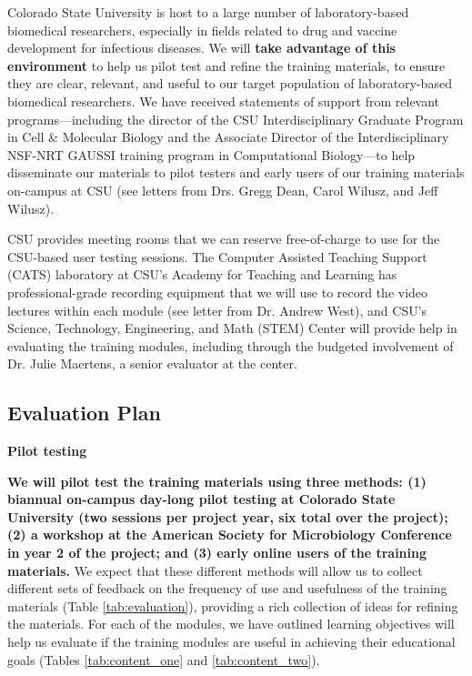 \documentclass[pdftex,english,11.5pt,parskip=half]{scrartcl}
\begin{document}
Colorado State University is host to a large number of laboratory-based
biomedical researchers, especially in fields related to drug and vaccine
development for infectious diseases. We will \textbf{take advantage of this
environment} to help us pilot test and refine the training materials, to ensure
they are clear, relevant, and useful to our target population of
laboratory-based biomedical researchers. We have received statements of support
from relevant programs---including the director of the CSU Interdisciplinary
Graduate Program in Cell \& Molecular Biology and the Associate Director of the
Interdisciplinary NSF-NRT GAUSSI training program in Computational Biology---to
help disseminate our materials to pilot testers and early users of our training
materials on-campus at CSU (see letters from Drs. Gregg Dean, Carol Wilusz, and Jeff
Wilusz). 

CSU provides meeting rooms
that we can reserve free-of-charge to use for the CSU-based user testing sessions. The
Computer Assisted Teaching Support (CATS) laboratory at CSU's Academy for
Teaching and Learning has professional-grade recording equipment that we will
use to record the video lectures within each module (see letter from Dr. Andrew
West), and CSU's Science, Technology, Engineering, and Math (STEM) Center will provide help in evaluating the training modules,
including through the budgeted involvement of Dr. Julie Maertens, a senior
evaluator at the center. 

\subsection{Evaluation Plan}

\textbf{Pilot testing}

\textbf{We will pilot test the training materials using three methods: (1) biannual on-campus  day-long pilot testing at Colorado State University (two sessions per project year, six total over the project); (2) a workshop at the American Society for Microbiology Conference in year 2 of the project; and (3) early online users of the training materials.} We expect that these different methods will allow us to collect different sets of 
feedback on the frequency of use and usefulness of the training materials (Table \ref*{tab:evaluation}), providing a rich collection of ideas for refining the materials. For each of the modules, we have outlined learning objectives will help us evaluate if the training modules are useful in achieving their educational goals (Tables \ref*{tab:content_one} and \ref*{tab:content_two}).
\end{document}

